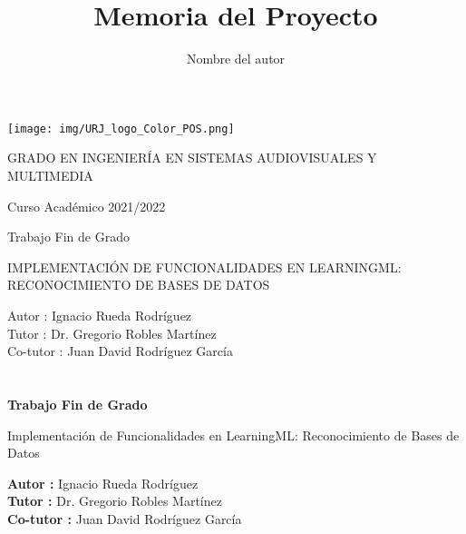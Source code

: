 \documentclass[a4paper, 12pt]{book}
\title{Memoria del Proyecto}
\author{Nombre del autor}
\begin{document}
\renewcommand{\refname}{Bibliografía}  %
\renewcommand{\appendixname}{Apéndice}


\begin{titlepage}
\begin{center}
\texttt{[image: img/URJ\_logo\_Color\_POS.png]}

\vspace{1.75cm}

\Large
GRADO EN INGENIERÍA EN SISTEMAS AUDIOVISUALES Y MULTIMEDIA

\vspace{0.4cm}

\large
Curso Académico 2021/2022

\vspace{0.8cm}

Trabajo Fin de Grado

\vspace{2.5cm}

\LARGE
IMPLEMENTACIÓN DE FUNCIONALIDADES EN LEARNINGML: RECONOCIMIENTO DE BASES DE DATOS

\vspace{3cm}

\large
Autor : Ignacio Rueda Rodríguez \\
Tutor : Dr. Gregorio Robles Martínez \\
Co-tutor : Juan David Rodríguez García
\end{center}
\end{titlepage}

\newpage
\mbox{}
\thispagestyle{empty} %


\clearpage
{}
\chapter*{}

\vspace{-4cm}
\begin{center}
\LARGE
\textbf{Trabajo Fin de Grado}

\vspace{1cm}
\large
Implementación de Funcionalidades en LearningML: Reconocimiento de Bases de Datos

\vspace{1cm}
\large
\textbf{Autor :} Ignacio Rueda Rodríguez \\
\textbf{Tutor :} Dr. Gregorio Robles Martínez \\
\textbf{Co-tutor :} Juan David Rodríguez García

\end{center}
\end{document}
